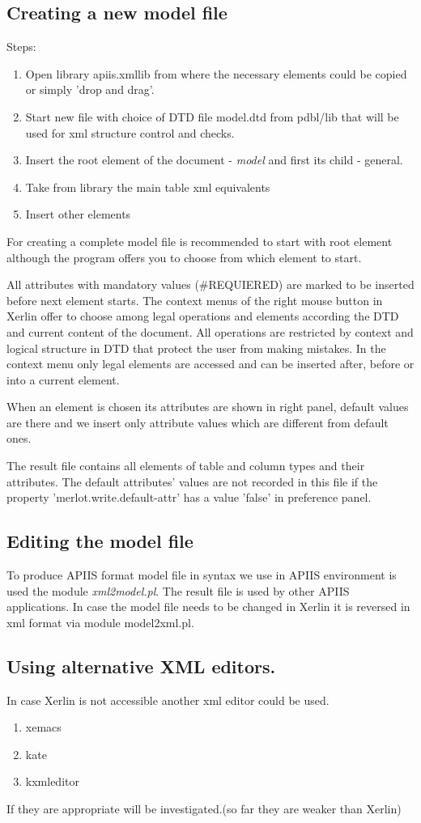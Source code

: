 \subsection{Creating a new model file}

Steps:

\begin{enumerate}
\item Open library apiis.xmllib from where the necessary elements could
be copied or simply 'drop and drag'.
\item Start new file with choice of DTD file model.dtd from pdbl/lib that
will be used for xml structure control and checks.
\item Insert the root element of the document - \emph{model} and first its
child - general. 
\item Take from library the main table xml equivalents
\item Insert other elements
\end{enumerate}
For creating a complete model file is recommended to start with root
element although the program offers you to choose from which element
to start.

All attributes with mandatory values (\#REQUIERED) are marked to be
inserted before next element starts. The context menus of the right
mouse button in Xerlin offer to choose among legal operations and
elements according the DTD and current content of the document. All
operations are restricted by context and logical structure in DTD
that protect the user from making mistakes. In the context menu only
legal elements are accessed and can be inserted after, before or into
a current element.

When an element is chosen its attributes are shown in right panel,
default values are there and we insert only attribute values which
are different from default ones.

The result file contains all elements of table and column types and
their attributes. The default attributes' values are not recorded
in this file if the property 'merlot.write.default-attr' has a value
'false' in preference panel. 


\subsection{Editing the model file}

To produce APIIS format model file in syntax we use in APIIS environment
is used the module \emph{xml2model.pl}. The result file is used by
other APIIS applications. In case the model file needs to be changed
in Xerlin it is reversed in xml format via module model2xml.pl. 


\subsection{Using alternative XML editors.}

In case Xerlin is not accessible another xml editor could be used. 

\begin{enumerate}
\item xemacs 
\item kate
\item kxmleditor
\end{enumerate}
If they are appropriate will be investigated.(so far they are weaker
than Xerlin) 


